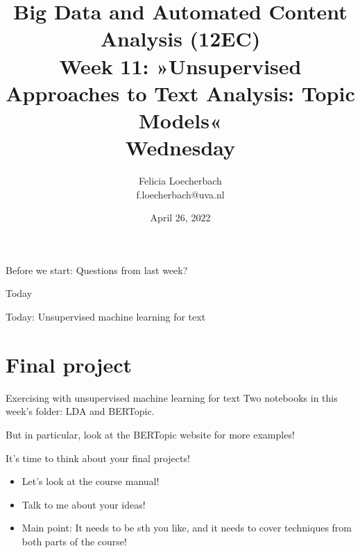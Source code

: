 

\graphicspath{{../../resources/img/}}




\title[Big Data and Automated Content Analysis]{\textbf{Big Data and Automated Content Analysis (12EC)} 
\\Week 11: »Unsupervised Approaches to Text Analysis: Topic Models«
\\Wednesday}
\author[Felicia Loecherbach]{Felicia Loecherbach\\ \footnotesize{f.loecherbach@uva.nl \\}}
\date{April 26, 2022}


\begin{frame}{}
	\titlepage
\end{frame}

\begin{frame}[standout]
Before we start: Questions from last week?
\end{frame}



\begin{frame}{Today}
	\tableofcontents
\end{frame}

\begin{frame}[standout]
Today: Unsupervised machine learning for text
\end{frame}









\section{Final project}
\begin{frame}{Exercising with unsupervised machine learning for text}
Two notebooks in this week's folder: LDA and BERTopic.

But in particular, look at the BERTopic website for more examples!
\end{frame}


\begin{frame}{It's time to think about your final projects!}
\begin{itemize}
\item Let's look at the course manual!
\item Talk to me about your ideas!
\item Main point: It needs to be sth you like, and it needs to cover techniques from both parts of the course!
\end{itemize}
\end{frame}




\begin{frame}
	\printbibliography
\end{frame}




